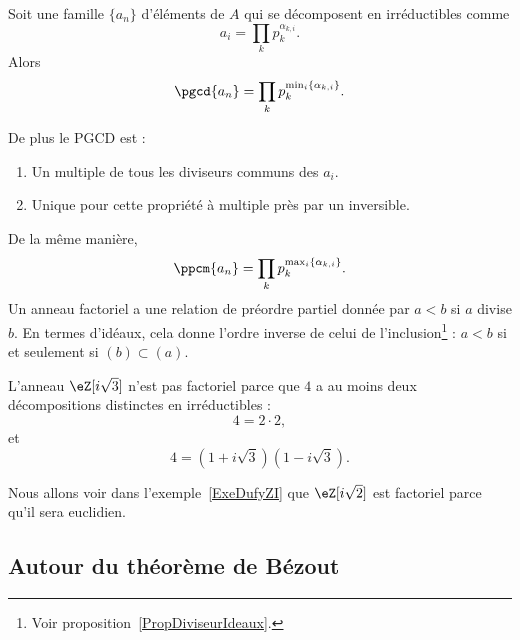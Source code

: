\begin{proposition}
	Soit une famille \( \{ a_n \}\) d'éléments de \( A\) qui se décomposent en irréductibles comme
	\begin{equation}
		a_i=\prod_k p_k^{\alpha_{k,i}}.
	\end{equation}
	Alors
	\begin{equation}
		\pgcd\{ a_n \}=\prod_k p_k^{\min_i\{ \alpha_{k,i} \}}.
	\end{equation}

	De plus le PGCD est :
	\begin{enumerate}
		\item
		      Un multiple de tous les diviseurs communs des \( a_i\).
		\item
		      Unique pour cette propriété à multiple près par un inversible.
	\end{enumerate}
\end{proposition}

De la même manière,
\begin{equation}
	\ppcm\{ a_n \}=\prod_kp_k^{\max_i\{ \alpha_{k,i} \}}.
\end{equation}
Un anneau factoriel a une relation de préordre partiel donnée par \( a<b\) si \( a\) divise \( b\). En termes d'idéaux, cela donne l'ordre inverse de celui de l'inclusion\footnote{Voir proposition~\ref{PropDiviseurIdeaux}.} : \( a<b\) si et seulement si \( (b)\subset (a)\).

\begin{example} \label{EXooCWJUooCDJqkr}
	L'anneau \( \eZ[i\sqrt{3}]\) n'est pas factoriel parce que \( 4\) a au moins deux décompositions distinctes en irréductibles :
	\begin{equation}
		4=2\cdot 2,
	\end{equation}
	et
	\begin{equation}
		4=(1+i\sqrt{3})(1-i\sqrt{3}).
	\end{equation}
\end{example}

Nous allons voir dans l'exemple~\ref{ExeDufyZI} que \( \eZ[i\sqrt{2}]\) est factoriel parce qu'il sera euclidien.

\subsection{Autour du théorème de Bézout}

